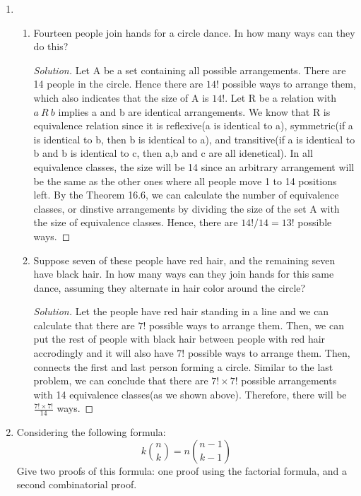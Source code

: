 \documentclass[12pt]{article}
\renewcommand\qedsymbol{$\blacksquare$}
\newenvironment{solution}
{\begin{proof}[Solution]\renewcommand\qedsymbol{$\square$}}
	{\end{proof}}
\begin{document}
\begin{enumerate}
\begin{proof}
		\end{proof}
		
		\item
		\begin{enumerate}
			\item Fourteen people join hands for a circle dance. In how many ways can they do this?
			\begin{solution}
				Let A be a set containing all possible arrangements. There are 14 people in the circle. Hence there are $14!$ possible ways to arrange them, which also indicates that the size of A is $14!$. Let R be a relation with $a \ R \ b$ implies a and b are identical arrangements. We know that R is equivalence relation since it is reflexive(a is identical to a), symmetric(if a is identical to b, then b is identical to a), and transitive(if a is identical to b and b is identical to c, then a,b and c are all idenetical). In all equivalence classes, the size will be 14 since an arbitrary arrangement will be the same as the other ones where all people move 1 to 14 positions left. By the Theorem 16.6, we can calculate the number of equivalence classes, or dinstive arrangements by dividing the size of the set A with the size of equivalence classes. Hence, there are $14!/14=13!$ possible ways.
				
				
			\end{solution}
			
			\item Suppose seven of these people have red hair, and the remaining seven have black hair. In how many ways can they join hands for this same dance, assuming they alternate in hair color around the circle?
			\begin{solution}
				
			   Let the people have red hair standing in a line and we can calculate that there are $7!$ possible ways to arrange them. Then, we can put the rest of people with black hair between people with red hair accrodingly and it will also have $7!$ possible ways to arrange them. Then, connects the first and last person forming a circle. Similar to the last problem, we can conclude that there are $7! \times 7!$ possible arrangements with 14 equivalence classes(as we shown above). Therefore, there will be $\frac{7! \times 7!}{14}$ ways.
				
				
			\end{solution}
		\end{enumerate}
		
		\item Considering the following formula:
		\[k {n\choose k} = n {n-1\choose k-1} \]
		Give two proofs of this formula: one proof using the factorial formula, and a second combinatorial proof.
		

\end{enumerate}
\end{document}
